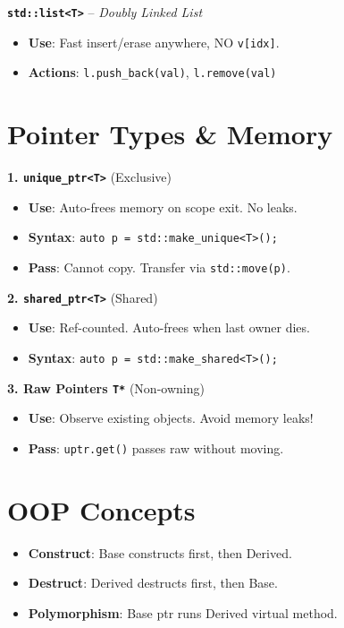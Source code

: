 \documentclass[9pt,twocolumn]{article}
\begin{document}
\textbf{\texttt{std::list<T>}} -- \textit{Doubly Linked List}
\begin{itemize}
    \setlength\itemsep{-0.3em}
    \item \textbf{Use}: Fast insert/erase anywhere, NO \texttt{v[idx]}.
    \item \textbf{Actions}: \texttt{l.push\_back(val)}, \texttt{l.remove(val)}
\end{itemize}

\section*{Pointer Types \& Memory}
\textbf{1. \texttt{unique\_ptr<T>}} (Exclusive)
\begin{itemize}
    \setlength\itemsep{-0.3em}
    \item \textbf{Use}: Auto-frees memory on scope exit. No leaks.
    \item \textbf{Syntax}: \texttt{auto p = std::make\_unique<T>();}
    \item \textbf{Pass}: Cannot copy. Transfer via \texttt{std::move(p)}.
\end{itemize}

\textbf{2. \texttt{shared\_ptr<T>}} (Shared)
\begin{itemize}
    \setlength\itemsep{-0.3em}
    \item \textbf{Use}: Ref-counted. Auto-frees when last owner dies.
    \item \textbf{Syntax}: \texttt{auto p = std::make\_shared<T>();}
\end{itemize}

\textbf{3. Raw Pointers \texttt{T*}} (Non-owning)
\begin{itemize}
    \setlength\itemsep{-0.3em}
    \item \textbf{Use}: Observe existing objects. Avoid memory leaks!
    \item \textbf{Pass}: \texttt{uptr.get()} passes raw without moving.
\end{itemize}

\section*{OOP Concepts}
\begin{itemize}
    \setlength\itemsep{-0.3em}
    \item \textbf{Construct}: Base constructs first, then Derived.
    \item \textbf{Destruct}: Derived destructs first, then Base.
    \item \textbf{Polymorphism}: Base ptr runs Derived virtual method.
\end{itemize}
\end{document}
